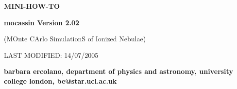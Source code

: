 \documentclass[11pt]{article}
\begin{document}
\centerline
{\Large \bf MINI-HOW-TO }

\vspace{4cm}

\centerline
{\Large \bf {\sc \Huge mocassin} Version 2.02 }

\vspace{2cm}

\centerline
{\Large (MOnte CArlo SimulationS of Ionized Nebulae) }


\vspace{3cm}

\centerline
{LAST MODIFIED: 14/07/2005}



\vspace{10cm}



\centerline
{\bf barbara ercolano, department of physics and astronomy, university college london, be@star.ucl.ac.uk} 

\vspace{10cm}


\vspace{0.7cm}

\pagebreak
\end{document}
